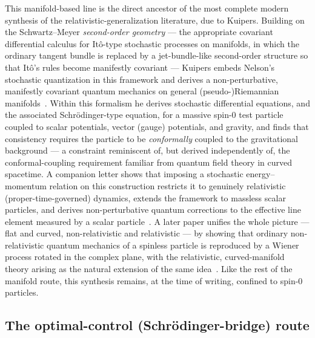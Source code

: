 \documentclass[11pt]{article}
\begin{document}
This manifold-based line is the direct ancestor of the most complete modern
synthesis of the relativistic-generalization literature, due to Kuipers.
Building on the Schwartz--Meyer \emph{second-order geometry} --- the
appropriate covariant differential calculus for It\^o-type stochastic
processes on manifolds, in which the ordinary tangent bundle is replaced by
a jet-bundle-like second-order structure so that It\^o's rules become
manifestly covariant --- Kuipers embeds Nelson's stochastic quantization in
this framework and derives a non-perturbative, manifestly covariant quantum
mechanics on general (pseudo-)Riemannian manifolds~\cite{kuipers2021a}.
Within this formalism he derives stochastic differential equations, and the
associated Schr\"odinger-type equation, for a massive spin-0 test particle
coupled to scalar potentials, vector (gauge) potentials, and gravity, and
finds that consistency requires the particle to be \emph{conformally}
coupled to the gravitational background --- a constraint reminiscent of,
but derived independently of, the conformal-coupling requirement familiar
from quantum field theory in curved spacetime. A companion letter shows
that imposing a stochastic energy--momentum relation on this construction
restricts it to genuinely relativistic (proper-time-governed) dynamics,
extends the framework to massless scalar particles, and derives 
non-perturbative quantum corrections to the effective line element measured
by a scalar particle~\cite{kuipers2021b}. A later paper unifies the whole
picture --- flat and curved, non-relativistic and relativistic --- by
showing that ordinary non-relativistic quantum mechanics of a spinless
particle is reproduced by a Wiener process rotated in the complex plane,
with the relativistic, curved-manifold theory arising as the natural
extension of the same idea~\cite{kuipers2023}. Like the rest of the
manifold route, this synthesis remains, at the time of writing, confined to
spin-0 particles.

\subsection{The optimal-control (Schr\"odinger-bridge) route}
\end{document}
